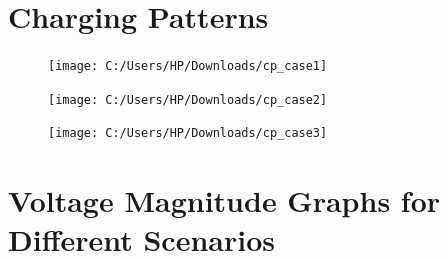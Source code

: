 	\section{Charging Patterns}
			\begin{figure}
				\centering
				\texttt{[image: C:/Users/HP/Downloads/cp\_case1]}
				\caption{}
				\label{fig:cpcase1}
			\end{figure}
			\begin{figure}
				\centering
				\texttt{[image: C:/Users/HP/Downloads/cp\_case2]}
				\caption{}
				\label{fig:cpcase2}
			\end{figure}
			\begin{figure}
				\centering
				\texttt{[image: C:/Users/HP/Downloads/cp\_case3]}
				\caption{}
				\label{fig:cpcase3}
			\end{figure}
			
			
			
			
			
			
			
	\section{Voltage Magnitude Graphs for Different Scenarios}
	

